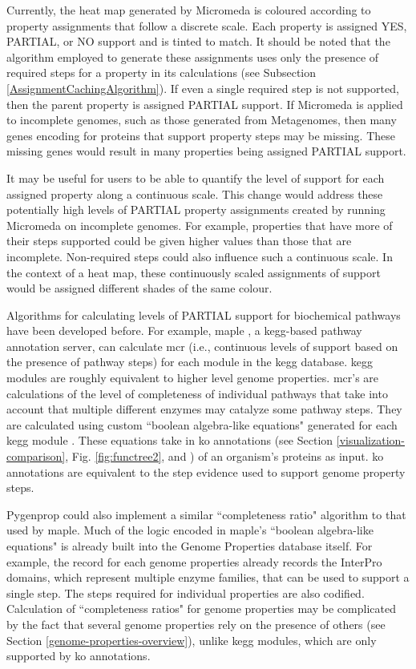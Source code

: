 Currently, the heat map generated by Micromeda is coloured according to property 
assignments that follow a discrete scale. Each property is assigned YES, 
PARTIAL, or NO support and is tinted to match. It should be noted that the 
algorithm employed to generate these assignments uses only the presence of 
required steps for a property in its calculations (see Subsection 
\ref{AssignmentCachingAlgorithm}). If even a single required step is not 
supported, then the parent property is assigned PARTIAL support. If Micromeda is 
applied to incomplete genomes, such as those generated from Metagenomes, then 
many genes encoding for proteins that support property steps may be missing. 
These missing genes would result in many properties being assigned PARTIAL 
support. 

It may be useful for users to be able to quantify the level of support for each 
assigned property along a continuous scale. This change would address these 
potentially high levels of PARTIAL property assignments created by running 
Micromeda on incomplete genomes. For example, properties that have more of their 
steps supported could be given higher values than those that are incomplete. 
Non-required steps could also influence such a continuous scale. In the context 
of a heat map, these continuously scaled assignments of support would be 
assigned different shades of the same colour.

Algorithms for calculating levels of PARTIAL support for biochemical pathways 
have been developed before. For example, \gls{maple} \cite{takami2016automated}, 
a \gls{kegg}-based pathway annotation server, can calculate \gls{mcr} (i.e., 
continuous levels of support based on the presence of pathway steps) for each 
module in the \gls{kegg}  database. \gls{kegg} modules are roughly equivalent to 
higher level genome properties. \gls{mcr}'s are calculations of the level of 
completeness of individual pathways that take into account that multiple 
different enzymes may catalyze some pathway steps. They are calculated using 
custom ``boolean algebra-like equations" generated for each \gls{kegg} module 
\cite{takami2012evaluation}. These equations take in \gls{ko} annotations (see 
Section \ref{visualization-comparison}, Fig. \ref{fig:functree2}, and 
\cite{mao2005automated}) of an organism's proteins as input. \gls{ko} 
annotations are equivalent to the step evidence used to support genome property 
steps. 

Pygenprop could also implement a similar ``completeness ratio" algorithm to that 
used by \gls{maple}. Much of the logic encoded in \gls{maple}'s ``boolean 
algebra-like equations" is already built into the Genome Properties database 
itself. For example, the record for each genome properties already records the 
InterPro domains, which represent multiple enzyme families, that can be used to 
support a single step. The steps required for individual properties are also 
codified. Calculation of ``completeness ratios" for genome properties may be 
complicated by the fact that several genome properties rely on the presence of 
others (see Section \ref{genome-properties-overview}), unlike \gls{kegg} 
modules, which are only supported by \gls{ko} annotations.

